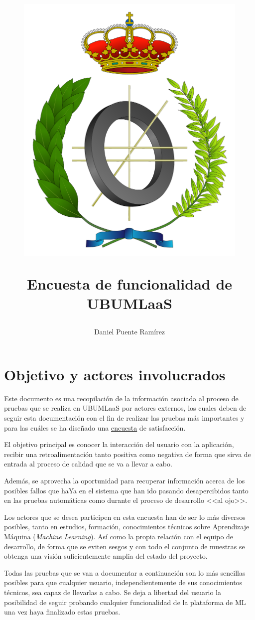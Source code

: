 \documentclass[
	12pt,
	spanish
]{article}
\title{
\begin{figure}[h!]
\centering
\includegraphics[width=0.5\linewidth]{../img/escudoInfor.pdf}
\end{figure}
Encuesta de funcionalidad de UBUMLaaS} %
\author{Daniel Puente Ramírez} %
\begin{document}
\maketitle 
\thispagestyle{empty}
\clearpage
\tableofcontents
\thispagestyle{empty}
\clearpage
\setcounter{page}{1}
\section{Objetivo y actores involucrados}
Este documento es una recopilación de la información asociada al proceso de pruebas que se realiza en UBUMLaaS por actores externos, los cuales deben de seguir esta documentación con el fin de realizar las pruebas más importantes y para las cuáles se ha diseñado una \href{https://forms.gle/yUoBxDyR3BaF7TjDA}{encuesta} de satisfacción.

El objetivo principal es conocer la interacción del usuario con la aplicación, recibir una retroalimentación tanto positiva como negativa de forma que sirva de entrada al proceso de calidad que se va a llevar a cabo. 

Además, se aprovecha la oportunidad para recuperar información acerca de los posibles fallos que haYa en el sistema que han ido pasando desapercibidos tanto en las pruebas automáticas como durante el proceso de desarrollo <<al ojo>>. 

Los actores que se desea participen en esta encuesta han de ser lo más diversos posibles, tanto en estudios, formación, conocimientos técnicos sobre Aprendizaje Máquina (\textit{Machine Learning}). Así como la propia relación con el equipo de desarrollo, de forma que se eviten sesgos y con todo el conjunto de muestras se obtenga una visión suficientemente amplia del estado del proyecto.

Todas las pruebas que se van a documentar a continuación son lo más sencillas posibles para que cualquier usuario, independientemente de sus conocimientos técnicos, sea capaz de llevarlas a cabo. Se deja a libertad del usuario la posibilidad de seguir probando cualquier funcionalidad de la plataforma de ML una vez haya finalizado estas pruebas.

\clearpage
\end{document}
